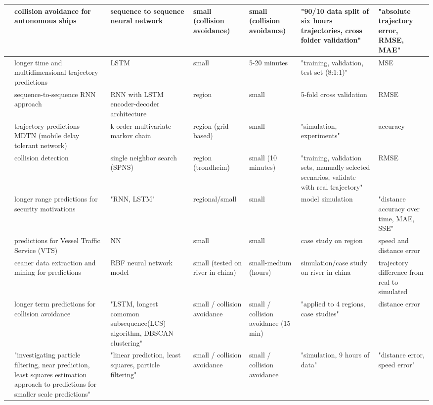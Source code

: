 \begin{sidewaystable}
{\begin{tabular}{|l|l|l|l|l|l|l|}
        \cite{Dijt2020TrajectoryShips} & collision avoidance for autonomous ships & sequence to sequence neural network & small (collision avoidance) & small (collision avoidance) & "90/10 data split of six hours trajectories, cross folder validation" & "absolute trajectory error, RMSE, MAE" \\ \hline
        \cite{DIng2020ALSTM} & longer time and multidimensional trajectory predictions & LSTM & small & 5-20 minutes & "training, validation, test set (8:1:1)" & MSE \\ \hline
        \cite{Forti2020PredictionNetworks} & sequence-to-sequence RNN approach & RNN with LSTM encoder-decoder architecture & region & small & 5-fold cross validation & RMSE \\ \hline
        \cite{Guo2018TrajectoryChain} & trajectory predictions MDTN (mobile delay tolerant network) & k-order multivariate markov chain & region (grid based) & small & "simulation, experiments" & accuracy \\ \hline
        \cite{Hexeberg2017AIS-basedPrediction} & collision detection & single neighbor search (SPNS) & region (trondheim) & small (10 minutes) & "training, validation sets, manually selected scenarios, validate with real trajectory" & RMSE \\ \hline
        \cite{Jin2020MaritimeNetwork} & longer range predictions for security motivations & "RNN, LSTM" & regional/small & small & model simulation & "distance accuracy over time, MAE, SSE" \\ \hline
        \cite{Kim2018PreprocessingArea} & predictions for Vessel Traffic Service (VTS) & NN & small & small & case study on region & speed and distance error \\ \hline
        \cite{Li2018ShipMining} & ceaner data extraction and mining for predictions & RBF neural network model & small (tested on river in china) & small-medium (hours) & simulation/case study on river in china & trajectory difference from real to simulated \\ \hline
        \cite{Li2019Long-termData} & longer term predictions for collision avoidance & "LSTM, longest comomon subsequence(LCS) algorithm, DBSCAN clustering" & small / collision avoidance & small / collision avoidance (15 min) & "applied to 4 regions, case studies" & distance error \\ \hline
        \cite{Lian2019ResearchAlgorithm} & "investigating particle filtering, near prediction, least squares estimation approach to predictions for smaller scale predictions" & "linear prediction, least squares, particle filtering" & small / collision avoidance & small / collision avoidance & "simulation, 9 hours of data" & "distance error, speed error" \\ \hline

\end{tabular}}
\end{sidewaystable}
